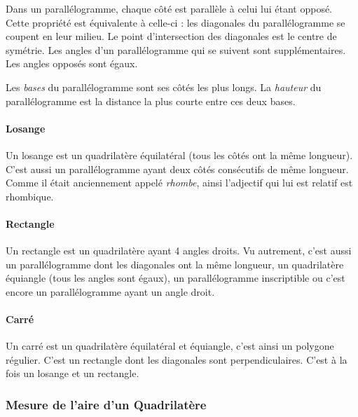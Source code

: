 \documentclass[a4paper, twoside]{article}
\begin{document}
Dans un parallélogramme, chaque côté est parallèle à celui lui étant opposé.
Cette propriété est équivalente à celle-ci : les diagonales du parallélogramme
se coupent en leur milieu. Le point d'intersection des diagonales est le centre de symétrie.
Les angles d'un parallélogramme qui se suivent sont supplémentaires.
Les angles opposés sont égaux.

Les \emph{bases} du parallélogramme sont ses côtés les plus longs.
La \emph{hauteur} du parallélogramme est la distance la plus courte entre ces deux bases.

\vspace*{-0.25cm}

\paragraph*{Losange}

Un losange est un quadrilatère équilatéral (tous les côtés ont la même longueur).
C'est aussi un parallélogramme ayant deux côtés consécutifs de même longueur.
Comme il était anciennement appelé \textit{rhombe},
ainsi l'adjectif qui lui est relatif est rhombique.

\vspace*{-0.25cm}

\paragraph*{Rectangle}

Un rectangle est un quadrilatère ayant 4 angles droits.
Vu autrement, c'est aussi un parallélogramme dont les diagonales ont la même longueur,
un quadrilatère équiangle (tous les angles sont égaux),
un parallélogramme inscriptible ou
c'est encore un parallélogramme ayant un angle droit.

\vspace*{-0.25cm}

\paragraph*{Carré}

Un carré est un quadrilatère équilatéral et équiangle, c'est ainsi un polygone régulier.
C'est un rectangle dont les diagonales sont perpendiculaires.
C'est à la fois un losange et un rectangle.

\subsubsection{Mesure de l'aire d'un Quadrilatère}
\end{document}
